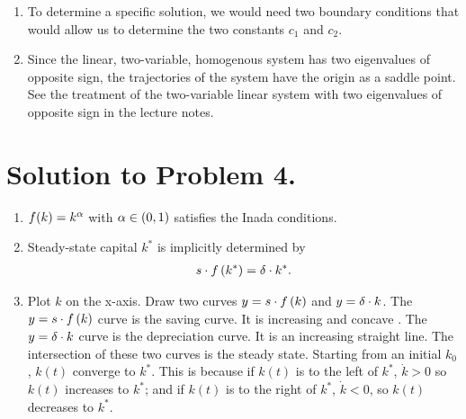 \documentclass[letterpaper,12pt,leqno]{article}
\begin{document}
\begin{enumerate}
\item To determine a specific solution, we would need two boundary conditions that would allow us to determine the two constants $c_{1}$ and $c_{2}$.
\item Since the linear, two-variable, homogenous system has two eigenvalues of opposite sign, the trajectories of the system have the origin as a saddle point. See the treatment of the two-variable linear system with two eigenvalues of opposite sign in the lecture notes.
\end{enumerate}

\section*{Solution to Problem 4.}

\begin{enumerate}
\item $f(k)=k^{\alpha}$ with $\alpha\in(0,1)$ satisfies the Inada conditions.
\item Steady-state capital $k^*$ is implicitly determined by
\begin{align*}
s\cdot f\left( k^* \right) =\delta \cdot k^*.
\end{align*}

\item Plot $k$ on the x-axis. Draw two curves $y=s\cdot f\left( k \right) $ and $y=\delta\cdot k$. The $y=s\cdot f\left( k \right)$ curve is the saving curve. It is increasing and concave . The $y=\delta\cdot  k$ curve is the depreciation curve. It is an increasing straight line. The intersection of these two curves is the steady state. Starting
from an initial $k_{0}$, $k(t)$ converge to $k^*$. This is because if $k(t)$ is to the left of $k^*$, $\dot{k}>0$
so $k(t)$ increases to $k^{*}$; and if $k(t)$ is to the right of $k^*$, $\dot{k}<0$, so $k(t)$ decreases to $k^{*}$.
\end{enumerate}
\end{document}
